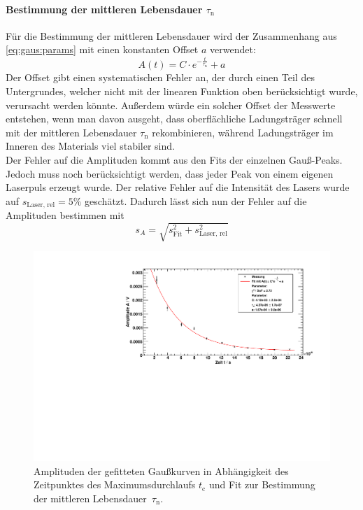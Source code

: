 \paragraph{Bestimmung der mittleren Lebensdauer $\tau_\text{n}$}
Für die Bestimmung der mittleren Lebensdauer wird der Zusammenhang aus \autoref{eq:gaus:params} mit einen konstanten Offset $a$ verwendet:
\begin{equation}
  A(t) = C \cdot e^{- \frac{t}{\tau_\text{n}}} + a
\end{equation}
Der Offset gibt einen systematischen Fehler an, der durch einen Teil des Untergrundes, welcher nicht mit der linearen Funktion oben 
berücksichtigt wurde, verursacht werden könnte.
Außerdem würde ein solcher Offset der Messwerte entstehen, wenn man davon ausgeht, dass oberflächliche Ladungsträger
schnell mit der mittleren Lebensdauer $\tau_{\text{n}}$ rekombinieren, während Ladungsträger im Inneren des Materials viel stabiler sind.\\
Der Fehler auf die Amplituden kommt aus den Fits der einzelnen Gauß-Peaks. Jedoch muss noch berücksichtigt werden, dass jeder Peak von einem 
eigenen Laserpuls erzeugt wurde. Der relative Fehler auf die Intensität des Lasers wurde auf $s_\text{Laser, rel} = 5\%$ geschätzt. Dadurch 
lässt sich nun der Fehler auf die Amplituden bestimmen mit 
\begin{equation}
  s_A = \sqrt{s_\text{Fit}^2 + s_\text{Laser, rel}^2}
\end{equation}
\begin{figure}[H]
\begin{center}
  \includegraphics[width=\textwidth]{../img/part2/dist_fitA.pdf}
  \caption{Amplituden der gefitteten Gaußkurven in Abhängigkeit des Zeitpunktes des Maximumsdurchlaufs $t_{\text{c}}$
  und Fit zur Bestimmung der mittleren Lebensdauer~$\tau_{\text{n}}$.}
  \label{img:dist:fita}
\end{center}
\end{figure}

